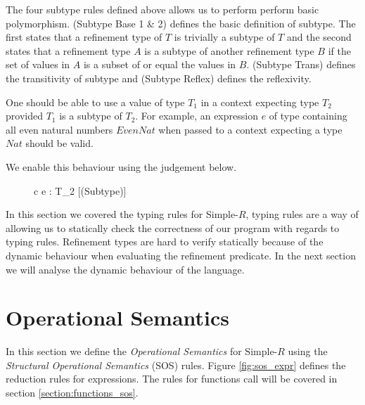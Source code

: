 \documentclass[a4paper,12pt]{report}
\begin{document}
\par
The four subtype rules defined above allows us to perform perform basic 
polymorphism. (Subtype Base 1 & 2) defines the basic definition of subtype. The 
first states that a refinement type of $T$ is trivially a subtype of $T$ and the 
second states that a refinement type $A$ is a subtype of another 
refinement type $B$ if the set of values in $A$ is a subset of or equal 
the values in $B$. (Subtype Trans) defines the transitivity of subtype and 
(Subtype Reflex) defines the reflexivity. 

\par
One should be able to use a value of type $T_1$ in a context 
expecting type $T_2$ provided $T_1$ is a subtype of $T_2$. For example, an 
expression $e$ of type containing all even natural numbers $EvenNat$ when passed 
to a context expecting a type $Nat$ should be valid. 

\par
We enable this behaviour using the judgement below.
\begin{figure}[H]
  \begin{center}
    \begin{tabular} {c}
      {\Gamma \vdash e : T_2} [(Subtype)]
    \end{tabular}
  \end{center}
\end{figure}

\par
In this section we covered the typing rules for Simple-$R$, typing rules are a 
way of allowing us to statically check the correctness of our program with 
regards to typing rules. Refinement types are hard to verify statically because 
of the dynamic behaviour when evaluating the refinement predicate. In the next 
section we will analyse the dynamic behaviour of the language. 

\section{Operational Semantics}
In this section we define the \textit{Operational Semantics} 
\cite{operationalSemantics} for Simple-$R$ using the \textit{Structural Operational Semantics} 
\cite{plotkinSOS} (SOS) rules. Figure \ref{fig:sos_expr} defines the 
reduction rules for expressions. The rules for functions 
call will be covered in section \ref{section:functions_sos}.
\end{document}
